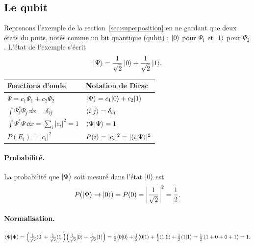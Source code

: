 \subsection{Le qubit}\label{sec:qubit}

Reprenons l'exemple de la section~\ref{sec:superposition} en ne gardant que deux états du puits,
notés comme un bit quantique (\gls{qubit}) :
$|0\rangle$ pour $\Psi_1$ et $|1\rangle$ pour $\Psi_2$. L'état de l'exemple s'écrit
\[
  |\Psi\rangle=\frac{1}{\sqrt2}\,|0\rangle+\frac{1}{\sqrt2}\,|1\rangle.
\]

\begin{center}
\renewcommand{\arraystretch}{1.85}
\begin{tabular}{@{}ll@{}}
\toprule
\textbf{Fonctions d'onde} & \textbf{Notation de Dirac} \\
\midrule
$\Psi=c_1\Psi_1+c_2\Psi_2$ & $|\Psi\rangle=c_1|0\rangle+c_2|1\rangle$ \\
$\displaystyle\int\Psi_i^*\Psi_j\,\dd x=\delta_{ij}$ & $\langle i|j\rangle=\delta_{ij}$ \\
$\displaystyle\int\Psi^*\Psi\,\dd x=\sum_i|c_i|^2=1$ & $\langle \Psi|\Psi\rangle=1$ \\
$P(E_i)=|c_i|^2$ & $P(i)=|c_i|^2=|\langle i|\Psi\rangle|^2$ \\
\bottomrule
\end{tabular}
\end{center}

\paragraph{Probabilité.} La probabilité que $|\Psi\rangle$ soit mesuré dans l'état
$|0\rangle$ est
\[
  P(|\Psi\rangle\to|0\rangle)=P(0)=\left|\frac{1}{\sqrt2}\right|^2=\frac12 .
\]

\paragraph{Normalisation.}
\[
  \langle \Psi|\Psi\rangle
  =\Big(\tfrac{1}{\sqrt2}\langle 0|+\tfrac{1}{\sqrt2}\langle 1|\Big)
   \Big(\tfrac{1}{\sqrt2}|0\rangle+\tfrac{1}{\sqrt2}|1\rangle\Big)
  =\tfrac12\langle 0|0\rangle+\tfrac12\langle 0|1\rangle+\tfrac12\langle 1|0\rangle+\tfrac12\langle 1|1\rangle
  =\tfrac12\,(1+0+0+1)=1 .
\]

